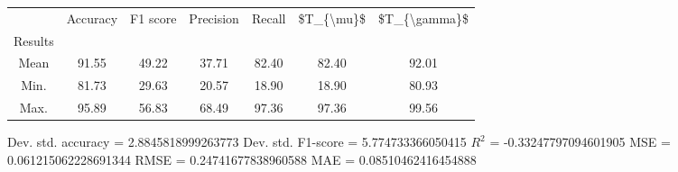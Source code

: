 \begin{tabular}{|c|c|c|c|c|c|c|}
\toprule
{} &  Accuracy &  F1 score &  Precision &  Recall &  \$T\_\{\textbackslash mu\}\$ &  \$T\_\{\textbackslash gamma\}\$ \\
Results &           &           &            &         &            &               \\
\hline
Mean    &     91.55 &     49.22 &      37.71 &   82.40 &      82.40 &         92.01 \\
Min.    &     81.73 &     29.63 &      20.57 &   18.90 &      18.90 &         80.93 \\
Max.    &     95.89 &     56.83 &      68.49 &   97.36 &      97.36 &         99.56 \\
\bottomrule
\end{tabular}

 Dev. std. accuracy = 2.8845818999263773
 Dev. std. F1-score = 5.774733366050415
 $R^2$ = -0.33247797094601905
 MSE = 0.061215062228691344
 RMSE = 0.24741677838960588
 MAE = 0.08510462416454888